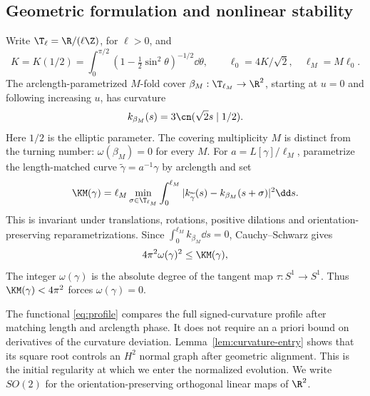 \subsection{Geometric formulation and nonlinear stability}
Write $\T_\ell=\R/(\ell\Z)$, for $\ell>0$, and
\begin{equation}\label{eq:lengths}
 K=K(1/2)=\int_0^{\pi/2}(1-\tfrac12\sin^2\theta)^{-1/2}\dd\theta,
 \qquad \ell_0=4K/\sqrt2,\quad \ell_M=M\ell_0.
\end{equation}
The arclength-parametrized $M$-fold cover $\beta_M:\T_{\ell_M}\to\R^2$, starting at $u=0$ and following increasing $u$, has curvature
\begin{equation}\label{eq:reference-curvature}
 k_{\beta_M}(s)=3\cn(\sqrt2s\mid1/2).
\end{equation}
Here $1/2$ is the elliptic parameter. The covering multiplicity $M$ is distinct from the turning number: $\omega(\beta_M)=0$ for every $M$. For $a=L[\gamma]/\ell_M$, parametrize the length-matched curve $\widetilde\gamma=a^{-1}\gamma$ by arclength and set
\begin{equation}\label{eq:profile}
 \KM(\gamma)=\ell_M\min_{\sigma\in\T_{\ell_M}}
 \int_0^{\ell_M}|k_{\widetilde\gamma}(s)-k_{\beta_M}(s+\sigma)|^2\dd s.
\end{equation}
This is invariant under translations, rotations, positive dilations and orientation-preserving reparametrizations. Since $\int_0^{\ell_M}k_{\beta_M}\dd s=0$, Cauchy--Schwarz gives
\begin{equation}\label{eq:turn-lock}
 4\pi^2\omega(\gamma)^2\le\KM(\gamma),
\end{equation}
The integer $\omega(\gamma)$ is the absolute degree of the tangent map $\tau:S^1\to S^1$. Thus $\KM(\gamma)<4\pi^2$ forces $\omega(\gamma)=0$.


The functional \eqref{eq:profile} compares the full signed-curvature profile after matching length and arclength phase. It does not require an a priori bound on derivatives of the curvature deviation. Lemma~\ref{lem:curvature-entry} shows that its square root controls an $H^2$ normal graph after geometric alignment. This is the initial regularity at which we enter the normalized evolution. We write $SO(2)$ for the orientation-preserving orthogonal linear maps of $\R^2$.

